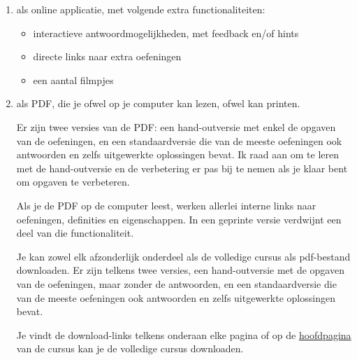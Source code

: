 \documentclass{ximera}
\begin{document}
\begin{enumerate}
 
   \item als online applicatie, met volgende extra functionaliteiten:
        \begin{itemize}
            \item interactieve antwoordmogelijkheden, met feedback en/of hints
            \item directe links naar extra oefeningen 
            \item een aantal filmpjes
        \end{itemize}
        
        
     \item als PDF, die je ofwel op je computer kan lezen, ofwel kan printen.
            \par
            Er zijn twee versies van de PDF: een hand-outversie met enkel de opgaven van de oefeningen, en een standaardversie die van de meeste oefeningen ook antwoorden en zelfs uitgewerkte oplossingen bevat. Ik raad aan om te leren met de hand-outversie en de verbetering er pas bij te nemen als je klaar bent om opgaven te verbeteren.
             
            Als je de PDF op de computer leest, werken allerlei interne links naar oefeningen, definities en eigenschappen. In een geprinte versie verdwijnt een deel van die functionaliteit.
            
            Je kan zowel elk afzonderlijk onderdeel als de volledige cursus als pdf-bestand downloaden. Er zijn telkens twee versies, een hand-outversie met de opgaven van de oefeningen, maar zonder de antwoorden, en een standaardversie die van de meeste oefeningen ook antwoorden en zelfs uitgewerkte oplossingen bevat.
        
            \begin{onlineOnly}
                Je vindt de download-links telkens onderaan elke pagina of op de \href{https://xerxes.ximera.org/sui/5de/Cursus_DDO}{hoofdpagina} van de cursus kan je de volledige cursus downloaden.
            \end{onlineOnly}

\end{enumerate}
 
\end{document}
